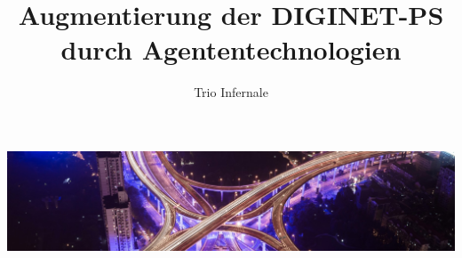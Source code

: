 \documentclass[acmlarge, anonymous]{acmart}
\begin{document}
\title{Augmentierung der DIGINET-PS durch Agententechnologien}


\author{Trio Infernale}

%


\renewcommand{\shortauthors}{Trio Infernale}

\begin{teaserfigure}
  \includegraphics[width=\textwidth]{paperteaser3}
\end{teaserfigure}


\setlength{\parindent}{0pt}

\maketitle


\end{document}
